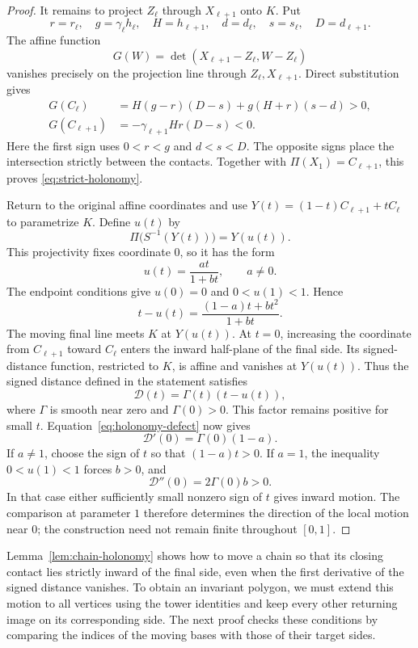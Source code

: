 \documentclass[11pt,a4paper]{article}
\theoremstyle{definition}
\theoremstyle{remark}
\numberwithin{equation}{section}
\begin{document}
\begin{proof}
It remains to project $Z_\ell$ through $X_{\ell+1}$ onto $K$. Put
\[
 r=r_\ell,\quad g=\gamma_\ell h_\ell,\quad H=h_{\ell+1},
 \quad d=d_\ell,\quad s=s_\ell,\quad D=d_{\ell+1}.
\]
The affine function
\[
 G(W)=\det(X_{\ell+1}-Z_\ell,W-Z_\ell)
\]
vanishes precisely on the projection line through $Z_\ell,X_{\ell+1}$. Direct substitution gives
\[
 \begin{split}
 G(C_\ell)&=H(g-r)(D-s)+g(H+r)(s-d)>0,\\
 G(C_{\ell+1})&=-\gamma_{\ell+1}Hr(D-s)<0.
 \end{split}
\]
Here the first sign uses $0<r<g$ and $d<s<D$. The opposite signs place the intersection strictly between the contacts. Together with $\Pi(X_1)=C_{\ell+1}$, this proves \eqref{eq:strict-holonomy}.

Return to the original affine coordinates and use $Y(t)=(1-t)C_{\ell+1}+tC_\ell$ to parametrize $K$. Define $u(t)$ by
\[
 \Pi\bigl(S^{-1}(Y(t))\bigr)=Y(u(t)).
\]
This projectivity fixes coordinate $0$, so it has the form
\[
 u(t)=\frac{at}{1+bt},\qquad a\ne0.
\]
The endpoint conditions give $u(0)=0$ and $0<u(1)<1$. Hence
\begin{equation}\label{eq:holonomy-defect}
 t-u(t)=\frac{(1-a)t+bt^2}{1+bt}.
\end{equation}
The moving final line meets $K$ at $Y(u(t))$. At $t=0$, increasing the coordinate from $C_{\ell+1}$ toward $C_\ell$ enters the inward half-plane of the final side. Its signed-distance function, restricted to $K$, is affine and vanishes at $Y(u(t))$. Thus the signed distance defined in the statement satisfies
\[
 \mathcal D(t)=\Gamma(t)(t-u(t)),
\]
where $\Gamma$ is smooth near zero and $\Gamma(0)>0$. This factor remains positive for small $t$. Equation~\eqref{eq:holonomy-defect} now gives
\[
 \mathcal D'(0)=\Gamma(0)(1-a).
\]
If $a\ne1$, choose the sign of $t$ so that $(1-a)t>0$. If $a=1$, the inequality $0<u(1)<1$ forces $b>0$, and
\[
 \mathcal D''(0)=2\Gamma(0)b>0.
\]
In that case either sufficiently small nonzero sign of $t$ gives inward motion. The comparison at parameter $1$ therefore determines the direction of the local motion near $0$; the construction need not remain finite throughout $[0,1]$.
\end{proof}

Lemma~\ref{lem:chain-holonomy} shows how to move a chain so that its closing contact lies strictly inward of the final side, even when the first derivative of the signed distance vanishes. To obtain an invariant polygon, we must extend this motion to all vertices using the tower identities and keep every other returning image on its corresponding side. The next proof checks these conditions by comparing the indices of the moving bases with those of their target sides.
\end{document}
